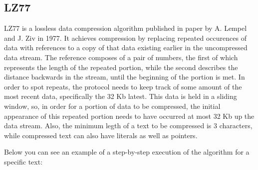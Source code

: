 \subsection{LZ77}
LZ77 is a lossless data compression algorithm published in paper by A. Lempel and J. Ziv in 1977. \cite{lz77} It achieves compression by replacing repeated occurences of data with references to a copy of that data existing earlier in the uncompressed data stream. The reference composes of a pair of numbers, the first of which represents the length of the repeated portion, while the second describes the distance backwards in the stream, until the beginning of the portion is met. In order to spot repeats, the protocol needs to keep track of some amount of the most recent data, specifically the 32 Kb latest. This data is held in a sliding window, so, in order for a portion of data to be compressed, the initial appearance of this repeated portion needs to have occurred at most 32 Kb up the data stream. Also, the minimum legth of a text to be compressed is 3 characters, while compressed text can also have literals as well as pointers.

Below you can see an example of a step-by-step execution of the algorithm for a specific text:

